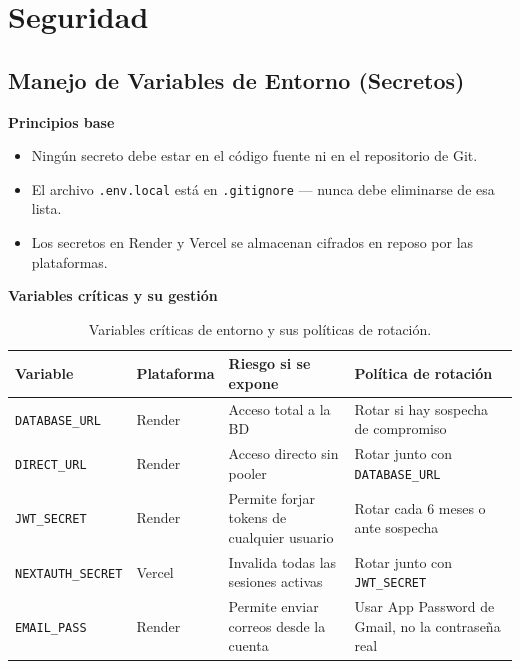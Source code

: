 \documentclass[12pt, a4paper]{article}
\begin{document}
\section{Seguridad}

\subsection{Manejo de Variables de Entorno (Secretos)}

\textbf{Principios base}

\begin{itemize}
    \item Ningún secreto debe estar en el código fuente ni en el repositorio de Git.
    \item El archivo \texttt{.env.local} está en \texttt{.gitignore} --- nunca debe eliminarse de esa lista.
    \item Los secretos en Render y Vercel se almacenan cifrados en reposo por las plataformas.
\end{itemize}

\bigskip
\textbf{Variables críticas y su gestión}

\begin{table}[H]
    \centering
    \begin{tabular}{p{3.2cm} p{1.8cm} p{4cm} p{4cm}}
        \toprule
        \textbf{Variable} & \textbf{Plataforma} & \textbf{Riesgo si se expone} & \textbf{Política de rotación} \\
        \midrule
        \texttt{DATABASE\_URL}
            & Render
            & Acceso total a la BD
            & Rotar si hay sospecha de compromiso \\[0.4cm]
        \texttt{DIRECT\_URL}
            & Render
            & Acceso directo sin pooler
            & Rotar junto con \texttt{DATABASE\_URL} \\[0.4cm]
        \texttt{JWT\_SECRET}
            & Render
            & Permite forjar tokens de cualquier usuario
            & Rotar cada 6 meses o ante sospecha \\[0.4cm]
        \texttt{NEXTAUTH\_SECRET}
            & Vercel
            & Invalida todas las sesiones activas
            & Rotar junto con \texttt{JWT\_SECRET} \\[0.4cm]
        \texttt{EMAIL\_PASS}
            & Render
            & Permite enviar correos desde la cuenta
            & Usar App Password de Gmail, no la contraseña real \\
        \bottomrule
    \end{tabular}
    \caption{Variables críticas de entorno y sus políticas de rotación.}
\end{table}
\end{document}
